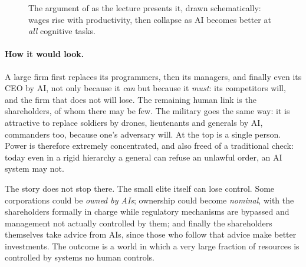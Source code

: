 \begin{figure}[tb]
\centering
{}
\caption{The argument of \citet{kulveit2025} as the lecture presents it, drawn schematically: wages rise with productivity, then collapse as AI becomes better at \emph{all} cognitive tasks.}
\label{fig:L1-labor}
\end{figure}

\paragraph{How it would look.} A large firm first replaces its programmers, then its managers, and finally even its CEO by AI, not only because it \emph{can} but because it \emph{must}: its competitors will, and the firm that does not will lose.
The remaining human link is the shareholders, of whom there may be few. The military goes the same way: it is attractive to replace soldiers by drones, lieutenants and generals by AI, commanders too, because one's adversary will. At the top is a single person.
Power is therefore extremely concentrated, and also freed of a traditional check: today even in a rigid hierarchy a general can refuse an unlawful order, an AI system may not.

The story does not stop there. The small elite itself can lose control. Some corporations could be \emph{owned by AIs}; ownership could become \emph{nominal}, with the shareholders formally in charge while regulatory mechanisms are bypassed and management not actually controlled by them; and finally the shareholders themselves
take advice from AIs, since those who follow that advice make better investments. The outcome is a world in which a very large fraction of resources is controlled by systems no human controls.

